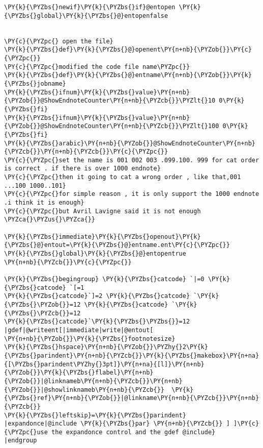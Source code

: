 \begin{Verbatim}[commandchars=\\\{\}]
\PY{k}{\PYZbs{}newif}\PY{k}{\PYZbs{}if}@entopen \PY{k}{\PYZbs{}global}\PY{k}{\PYZbs{}@}entopenfalse


\PY{c}{\PYZpc{} open the file}
\PY{k}{\PYZbs{}def}\PY{k}{\PYZbs{}@}openent\PY{n+nb}{\PYZob{}}\PY{c}{\PYZpc{}}
\PY{c}{\PYZpc{}modified the code file name\PYZpc{}}
\PY{k}{\PYZbs{}def}\PY{k}{\PYZbs{}@}entname\PY{n+nb}{\PYZob{}}\PY{k}{\PYZbs{}jobname}
\PY{k}{\PYZbs{}ifnum}\PY{k}{\PYZbs{}value}\PY{n+nb}{\PYZob{}}@ShowEndnoteCounter\PY{n+nb}{\PYZcb{}}\PYZlt{}10 0\PY{k}{\PYZbs{}fi}
\PY{k}{\PYZbs{}ifnum}\PY{k}{\PYZbs{}value}\PY{n+nb}{\PYZob{}}@ShowEndnoteCounter\PY{n+nb}{\PYZcb{}}\PYZlt{}100 0\PY{k}{\PYZbs{}fi}
\PY{k}{\PYZbs{}arabic}\PY{n+nb}{\PYZob{}}@ShowEndnoteCounter\PY{n+nb}{\PYZcb{}}\PY{n+nb}{\PYZcb{}}\PY{c}{\PYZpc{}}
\PY{c}{\PYZpc{}set the name is 001 002 003 .099.100. 999 for cat order is correct . if there is over 1000 endnote}
\PY{c}{\PYZpc{}then it going to cat a wrong order , like that,001 ...100 1000..101}
\PY{c}{\PYZpc{}for simple reason , it is only support the 1000 endnote .i think it is enough}
\PY{c}{\PYZpc{}but Avril Lavigne said it is not enough \PYZca{}\PYZus{}\PYZca{}}

\PY{k}{\PYZbs{}immediate}\PY{k}{\PYZbs{}openout}\PY{k}{\PYZbs{}@}entout=\PY{k}{\PYZbs{}@}entname.ent\PY{c}{\PYZpc{}}
\PY{k}{\PYZbs{}global}\PY{k}{\PYZbs{}@}entopentrue
\PY{n+nb}{\PYZcb{}}\PY{c}{\PYZpc{}}

\PY{k}{\PYZbs{}begingroup} \PY{k}{\PYZbs{}catcode} `|=0 \PY{k}{\PYZbs{}catcode} `[=1
\PY{k}{\PYZbs{}catcode}`]=2 \PY{k}{\PYZbs{}catcode} `\PY{k}{\PYZbs{}\PYZob{}}=12 \PY{k}{\PYZbs{}catcode} `\PY{k}{\PYZbs{}\PYZcb{}}=12
\PY{k}{\PYZbs{}catcode}`\PY{k}{\PYZbs{}\PYZbs{}}=12
|gdef|@writeent[|immediate|write|@entout[
\PY{n+nb}{\PYZob{}}\PY{k}{\PYZbs{}footnotesize}
\PY{k}{\PYZbs{}hspace}\PY{n+nb}{\PYZob{}}\PYZhy{}2\PY{k}{\PYZbs{}parindent}\PY{n+nb}{\PYZcb{}}\PY{k}{\PYZbs{}makebox}\PY{n+na}{[\PYZbs{}parindent\PYZhy{}3pt]}\PY{n+na}{[l]}\PY{n+nb}{\PYZob{}}\PY{k}{\PYZbs{}flabel}\PY{n+nb}{\PYZob{}}|@linknameb\PY{n+nb}{\PYZcb{}}\PY{n+nb}{\PYZob{}}|@showlinknameb\PY{n+nb}{\PYZcb{}}  \PY{k}{\PYZbs{}ref}\PY{n+nb}{\PYZob{}}|@linkname\PY{n+nb}{\PYZcb{}}\PY{n+nb}{\PYZcb{}}
\PY{k}{\PYZbs{}leftskip}=\PY{k}{\PYZbs{}parindent}   |expandonce|@include \PY{k}{\PYZbs{}par} \PY{n+nb}{\PYZcb{}} ] ]\PY{c}{\PYZpc{}use the expandonce control and the gdef @include}
|endgroup


\end{Verbatim}
